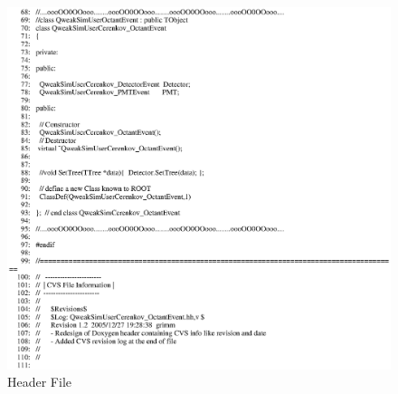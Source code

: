 \begin{figure}[ht]
  \hspace{0cm}
  \includegraphics[scale=0.8]{./figures5/QweakSimUserCerenkov_OctantEvent.hh-p2.eps}
  \caption{\label{SourceV29} Header File}
           \label{fig:V-SC-33}
\end{figure}

\clearpage

